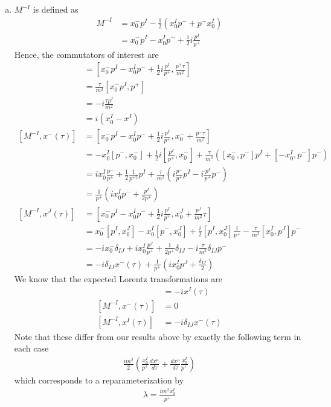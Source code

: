 \documentclass[11pt]{article}
\begin{document}
\begin{enumerate}[(a)]
    \item $M^{-I}$ is defined as 
    \begin{align*}
        M^{-I} &= x_0^- p^I - \frac{1}{2} (x_0^I p^- + p^- x_0^I) \\
        &= x_0^- p^I - x_0^I p^- + \frac{1}{2}i \frac{p^I}{p^+}
    \end{align*}
    Hence, the commutators of interest are 
    \begin{align*}
        [M^{-I}, x^+(\tau)] &= \left[x_0^- p^I - x_0^I p^- + \frac{1}{2}i \frac{p^I}{p^+}, \frac{p^+ \tau }{m^2}\right] \\
        &= \frac{\tau }{m^2} [x_0^- p^I, p^+] \\
        &= -i \frac{\tau p^I}{m^2} \\
        &= i (x_0^I - x^I) \\
        [M^{-I}, x^- (\tau)] &= \left[x_0^- p^I - x_0^I p^- + \frac{1}{2}i \frac{p^I}{p^+}, x_0^- + \frac{p^- \tau }{m^2}\right] \\
        &= -x_0^I[ p^-, x_0^-] + \frac{1}{2}i [\frac{p^I}{p^+}, x_0^-] + \frac{\tau }{m^2} \left( [x_0^-, p^-] p^I + [-x_0^I, p^-] p^- \right) \\
        &= i x_0^I \frac{p^-}{p^+} + \frac{1}{2} \frac{1}{p^{+2}} p^I + \frac{\tau}{m^2} \left( i \frac{p^-}{p^+} p^I - i \frac{p^I}{p^+}p^- \right) \\
        &= \frac{1}{p^+} \left( ix_0^I p^- + \frac{p^I}{2p^+} \right) \\
        [M^{-I}, x^J(\tau)] &= \left[x_0^- p^I - x_0^I p^- + \frac{1}{2}i \frac{p^I}{p^+}, x_0^J + \frac{p^J}{m^2} \tau \right] \\
        &= x_0^- [p^I, x_0^J] - x_0^I [p^-, x_0^J ] + \frac{i}{2} [p^I, x_0^J] \frac{1}{p^+} - \frac{\tau}{m^2}[x_0^I, p^J] p^- \\
        &= -i x_0^- \delta_{IJ} + ix_0^I \frac{p^J}{p^+} + \frac{1}{2p^+} \delta_{IJ} - i\frac{\tau }{m^2} \delta_{IJ} p^- \\
        &= -i \delta_{IJ} x^-(\tau) + \frac{1}{p^+} \left( ix_0^I p^J + \frac{\delta_{IJ}}{2} \right)   
    \end{align*}
    We know that the expected Lorentz transformations are 
    \begin{align*}
        [M^{-I}, x^+(\tau)] &= -ix^I(\tau) \tag{11.80} \\
        [M^{-I}, x^-(\tau)] &= 0 \\
        [M^{-I}, x^I(\tau)] &= -i \delta_{IJ}x^-(\tau) 
    \end{align*}
    Note that these differ from our results above by exactly the following term in each case 
    \begin{align*}
        \frac{im^2}{2} \left( \frac{x_0^I}{p^+} \frac{dx^\mu}{d\tau} + \frac{dx^\mu}{d\tau} \frac{x_0^I }{p^+} \right) 
    \end{align*}
    which corresponds to a reparameterization by 
    \begin{align*}
        \lambda = \frac{im^2 x_0^I}{p^+}
    \end{align*}
\end{enumerate}
\end{document}
